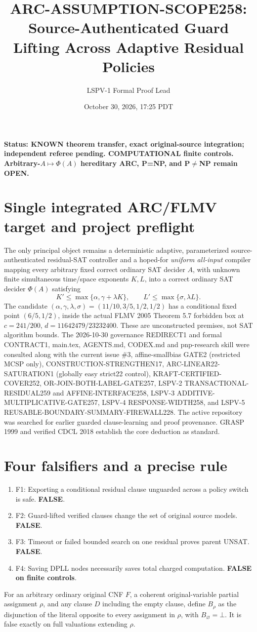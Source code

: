 \documentclass[11pt]{article}
\title{ARC-ASSUMPTION-SCOPE258: Source-Authenticated Guard Lifting Across Adaptive Residual Policies}
\author{LSPV-1 Formal Proof Lead}
\date{October 30, 2026, 17:25 PDT}
\begin{document}
\maketitle
\noindent\textbf{Status: KNOWN theorem transfer, exact original-source integration; independent referee pending. COMPUTATIONAL finite controls. Arbitrary-\(A\mapsto\Phi(A)\) hereditary ARC, P=NP, and P\(\ne\)NP remain OPEN.}

\section{Single integrated ARC/FLMV target and project preflight}
The only principal object remains a deterministic adaptive, parameterized source-authenticated residual-SAT controller and a hoped-for \emph{uniform all-input} compiler mapping every arbitrary fixed correct ordinary SAT decider \(A\), with unknown finite simultaneous time/space exponents \(K,L\), into a correct ordinary SAT decider \(\Phi(A)\) satisfying
\[
K'\le\max\{\alpha,\gamma+\lambda K\},\qquad
L'\le\max\{\sigma,\lambda L\}.
\]
The candidate \((\alpha,\gamma,\lambda,\sigma)=(11/10,3/5,1/2,1/2)\) has a conditional fixed point \((6/5,1/2)\), inside the actual FLMV 2005 Theorem 5.7 forbidden box at \(c=241/200\), \(d=11642479/23232400\). These are unconstructed premises, not SAT algorithm bounds. The 2026-10-30 governance REDIRECT1 and formal CONTRACT1, main.tex, AGENTS.md, CODEX.md and pnp-research skill were consulted along with the current issue \#3, affine-smallbias GATE2 (restricted MCSP only), CONSTRUCTION-STRENGTHEN17, ARC-LINEAR22-SATURATION1 (globally easy strict22 control), KRAFT-CERTIFIED-COVER252, OR-JOIN-BOTH-LABEL-GATE257, LSPV-2 TRANSACTIONAL-RESIDUAL259 and AFFINE-INTERFACE258, LSPV-3 ADDITIVE-MULTIPLICATIVE-GATE257, LSPV-4 RESPONSE-WIDTH258, and LSPV-5 REUSABLE-BOUNDARY-SUMMARY-FIREWALL228. The active repository was searched for earlier guarded clause-learning and proof provenance. GRASP 1999 and verified CDCL 2018 establish the core deduction as standard.

\section{Four falsifiers and a precise rule}
\begin{enumerate}
\item[] F1: Exporting a conditional residual clause unguarded across a policy switch is safe. \textbf{FALSE}.
\item[] F2: Guard-lifted verified clauses change the set of original source models. \textbf{FALSE}.
\item[] F3: Timeout or failed bounded search on one residual proves parent UNSAT. \textbf{FALSE}.
\item[] F4: Saving DPLL nodes necessarily saves total charged computation. \textbf{FALSE on finite controls}.
\end{enumerate}
For an arbitrary ordinary original CNF \(F\), a coherent original-variable partial assignment \(\rho\), and any clause \(D\) including the empty clause, define \(B_\rho\) as the disjunction of the literal opposite to every assignment in \(\rho\), with \(B_\varnothing=\bot\). It is false exactly on full valuations extending \(\rho\).
\end{document}
